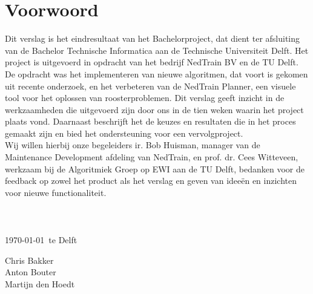 \section*{Voorwoord}
Dit verslag is het eindresultaat van het Bachelorproject, dat dient ter afsluiting van de Bachelor Technische Informatica aan de Technische Universiteit Delft. Het project is uitgevoerd in opdracht van het bedrijf NedTrain BV en de TU Delft.\\ 

De opdracht was het implementeren van nieuwe algoritmen, dat voort is gekomen uit recente onderzoek, en het verbeteren van de NedTrain Planner, een visuele tool voor het oplossen van roosterproblemen. Dit verslag geeft inzicht in de werkzaamheden die uitgevoerd zijn door ons in de tien weken waarin het project plaats vond. Daarnaast beschrijft het de keuzes en resultaten die in het proces gemaakt zijn en bied het ondersteuning voor een vervolgproject.\\

Wij willen hierbij onze begeleiders ir. Bob Huisman, manager van de Maintenance Development afdeling van NedTrain, en prof. dr. Cees Witteveen, werkzaam bij de Algoritmiek Groep op EWI aan de TU Delft, bedanken voor de feedback op zowel het product als het verslag en geven van idee\"en en inzichten voor nieuwe functionaliteit. 
\\ \\ \\ \\
\today ~te Delft

Chris Bakker \\
Anton Bouter \\
Martijn den Hoedt
